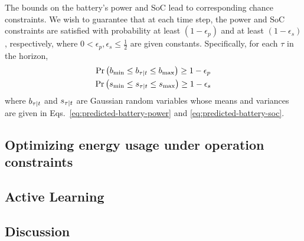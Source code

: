 The bounds on the battery's power and SoC lead to corresponding chance constraints.
We wish to guarantee that at each time step, the power and SoC constraints are satisfied with probability at least \((1 - \epsilon_p)\) and  at least \((1 - \epsilon_s)\), respectively, where \(0 < \epsilon_p, \epsilon_s \leq \frac{1}{2}\) are given constants.
Specifically, for each \(\tau\) in the horizon,
\begin{subequations}\label{eq:chance-constraints}
	\begin{gather}
	\Pr\left( \Pbmin \leq \predict{\tau}{\Pbatt} \leq \Pbmax \right) \geq 1 - \epsilon_p \label{eq:chance-constraints:power} \\
	\Pr\left( \SOCmin \leq \predict{\tau}{s} \leq \SOCmax \right) \geq 1 - \epsilon_s \label{eq:chance-constraints:soc}
	\end{gather}
\end{subequations}
where \(b_{\tau | t}\) and \(s_{\tau | t}\) are Gaussian random variables whose means and variances are given in Eqs.~\eqref{eq:predicted-battery-power} and \eqref{eq:predicted-battery-soc}.


\subsection{Optimizing energy usage under operation constraints}
\label{SS:energy_management}

\begin{figure}[!tb]
	\centering
	\missingfigure[figwidth=20pc]{}
	\caption{}
	\captionsetup{justification=centering}
	\label{F:MPC2}
\end{figure}

\subsection{Active Learning}

\subsection{Discussion}

%

